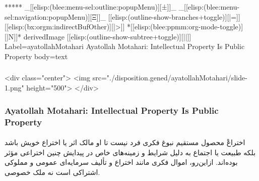 \begin{whenOrg}
\begin{whenOrg}
*****  _[[elisp:(blee:menu-sel:outline:popupMenu)][±]]_ _[[elisp:(blee:menu-sel:navigation:popupMenu)][Ξ]]_ [[elisp:(outline-show-branches+toggle)][|=]] [[elisp:(bx:orgm:indirectBufOther)][|>]] *[[elisp:(blee:ppmm:org-mode-toggle)][|N]]*  derivedImage [[elisp:(outline-show-subtree+toggle)][||]] Label=ayatollahMotahari Ayatollah Motahari: Intellectual Property Is Public Property body=text
\end{whenOrg}

\begin{htmlonly}

\begin{frame}[fragile,plain,label=ayatollahMotahari]
    \frametitle{}
    \framesubtitle{}
    \begin{rawhtml}
<div class="center">
<img src="./disposition.gened/ayatollahMotahari/slide-1.png" height="500">
</div>
    \end{rawhtml}
\end{frame}
\end{htmlonly}

\begin{verblatex}

\begin{frame}[fragile,plain,label=ayatollahMotahari]
    \frametitle{Ayatollah Motahari: Intellectual Property Is Public Property}
    \framesubtitle{}



\RTL
  \begin{faPar}

    اختراعْ محصول مستقیم نبوغ فکری فرد نیست تا او مالک اثر یا
    اختراع خویش باشد بلکه طبیعت یا اجتماع به دلیل شرایط و
    زمینه‌های خاص در پیدایش چنین اختراعی مؤثر بوده‌اند. ازاین‌رو،
    اموال فکری مانند اختراع و تألیف سرمایه‌ای عمومی و مملوکی
    اشتراکی است نه ملک خصوصی.


  \end{faPar}
\LTR


\end{frame}
\end{verblatex}
\end{whenOrg}

